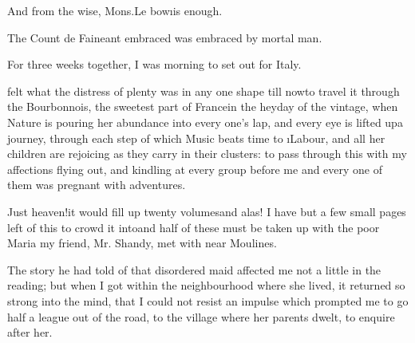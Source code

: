 \documentclass[twoside]{article}
\begin{document}

\tskk And from the wise, Mons.\@ Le\break
{}
bow\tskk \i{is enough}.

The Count de Faineant embraced\break
{}
was embraced by mortal man.

For three weeks together, I was\break
{}
morning to set out for Italy.




\vskip 6pt


 felt what the distress
of plenty was in any one shape till
now\tskk to travel it through the
Bourbonnois, the sweetest part of
France\tskk in the heyday of the vintage,
when Nature is pouring her abundance into
every one’s lap, and every eye is lifted
up\tskk a journey, through each step of
which Music beats time to \i{Labour}, and
all her children are rejoicing as they
carry in their clusters: to pass through
this with my affections flying out, and
kindling at every group before me\tskk
and every one of them was pregnant with
adventures.\tskk 

Just heaven!\tskk it would fill up twenty
volumes\tskk and alas! I have but a few
small pages left of this to crowd it
into\tskk and half of these must be taken
up with the poor Maria my friend, Mr.
Shandy, met with near Moulines.

The story he had told of that disordered
maid affected me not a little in the
reading; but when I got within the
neighbourhood where she lived, it returned
so strong into the mind, that I could not
resist an impulse which prompted me to go
half a league out of the road, to the
village where her parents dwelt, to
enquire after her.
\end{document}
